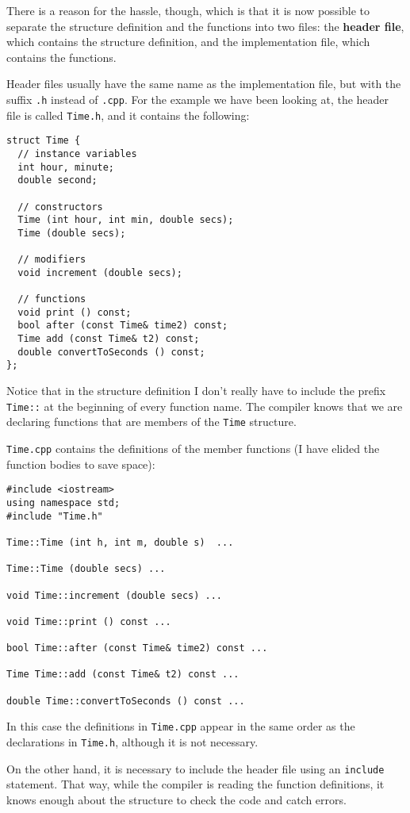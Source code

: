 {There is a reason for the hassle, though, which is that it
is now possible to separate the structure definition and the
functions into two files: the {\bf header file},
which contains the structure definition, and the implementation
file, which contains the functions.

Header files usually have the same name as the implementation
file, but with the suffix {\tt .h} instead of {\tt .cpp}.  For
the example we have been looking at, the header file is called
{\tt Time.h}, and it contains the following:

\begin{verbatim}
struct Time {
  // instance variables
  int hour, minute;
  double second;

  // constructors
  Time (int hour, int min, double secs);
  Time (double secs);

  // modifiers
  void increment (double secs);

  // functions
  void print () const;
  bool after (const Time& time2) const;
  Time add (const Time& t2) const;
  double convertToSeconds () const;
};
\end{verbatim}
%
Notice that in the structure definition I don't really have
to include the prefix {\tt Time::} at the beginning of every
function name.  The compiler knows that we are declaring functions
that are members of the {\tt Time} structure.

{\tt Time.cpp} contains the definitions of the member functions
(I have elided the function bodies to save space):

\begin{verbatim}
#include <iostream>
using namespace std;
#include "Time.h"

Time::Time (int h, int m, double s)  ...

Time::Time (double secs) ...

void Time::increment (double secs) ...

void Time::print () const ...

bool Time::after (const Time& time2) const ...

Time Time::add (const Time& t2) const ...

double Time::convertToSeconds () const ...
\end{verbatim}
%
In this case the definitions in {\tt Time.cpp} appear in the
same order as the declarations in {\tt Time.h}, although it
is not necessary.

On the other hand, it is necessary to include the header
file using an {\tt include} statement.  That way, while the
compiler is reading the function definitions, it knows enough
about the structure to check the code and catch errors.

}
